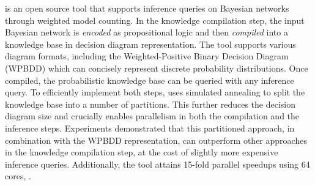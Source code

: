 
\toolname is an open source tool that supports inference queries on Bayesian networks through weighted model counting.
In the knowledge compilation step, the input Bayesian network is \emph{encoded} as propositional logic and then \emph{compiled} into a knowledge base in decision diagram representation. The tool supports various diagram formats, including the Weighted-Positive Binary Decision Diagram (WPBDD) which can concisely represent discrete probability distributions.
Once compiled, the probabilistic knowledge base can be queried with any inference query.
To efficiently implement both steps, \toolname uses simulated annealing to split the knowledge base into a number of partitions. This further reduces the decision diagram size and crucially enables parallelism in both the compilation and the inference steps.
Experiments demonstrated that this partitioned approach, in combination with the WPBDD representation, can outperform other approaches in the knowledge compilation step, at the cost of slightly more expensive inference queries.
Additionally, the tool attains 15-fold parallel speedups using 64 cores, .





